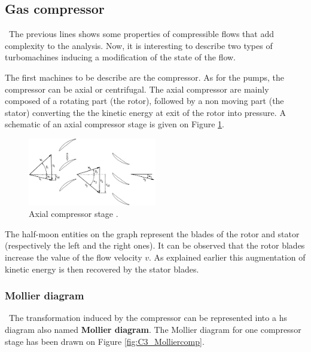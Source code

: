 \subsection{Gas compressor}
\quad\ The previous lines shows some properties of compressible flows that add complexity to the analysis. Now, it is interesting to describe two types of turbomachines inducing a modification of the state of the flow.

The first machines to be describe are the compressor. As for the pumps, the compressor can be axial or centrifugal.  The axial compressor are mainly composed of a rotating part (the rotor), followed by a non moving part (the stator) converting the the kinetic energy at exit of the rotor into pressure. A schematic of an axial compressor stage is given on Figure \ref{fig:C3_compstage}.

\begin{figure}[h]
    \centering
    \includegraphics[width=0.5\textwidth]{Comp_stage.png}
    \caption{Axial compressor stage \cite{Hillewaert2019}.}
    \label{fig:C3_compstage}
\end{figure}

The half-moon entities on the graph represent the blades of the rotor and stator (respectively the left and the right ones). It can be observed that the rotor blades increase the value of the flow velocity \(v\). As explained earlier this augmentation of kinetic energy is then recovered by the stator blades.

\subsubsection{Mollier diagram}
\quad\ The transformation induced by the compressor can be represented into a hs diagram also named \textbf{Mollier diagram}. The Mollier diagram for one compressor stage has been drawn on Figure \ref{fig:C3_Molliercomp}.

